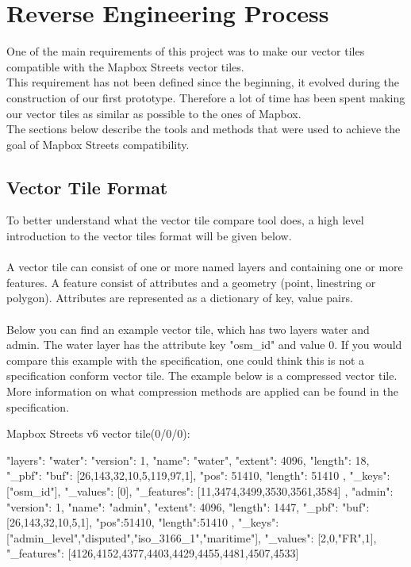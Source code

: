 \section{Reverse Engineering Process}\label{reverse_engineering_process}
One of the main requirements of this project was to make our vector tiles compatible with the Mapbox Streets vector tiles\cite{22_mapbox.com_2015}.
\\
This requirement has not been defined since the beginning, it evolved during the construction of our first prototype.
Therefore a lot of time has been spent making our vector tiles as similar as possible to the ones of Mapbox.
\\
The sections below describe the tools and methods that were used to achieve the goal of Mapbox Streets compatibility.

\subsection{Vector Tile Format}\label{vector_tile_format}
To better understand what the vector tile compare tool does, a high level introduction to the vector tiles format will be given below.
\\\\
A vector tile can consist of one or more named layers and containing one or more features. A feature consist of attributes and a geometry (point, linestring or polygon). Attributes are represented as a dictionary of key, value pairs. 
\\\\
Below you can find an example vector tile, which has two layers water and admin. The water layer has the attribute key "osm\_id" and value 0. If you would compare this example with the specification\cite{4_github_2015}, one could think this is not a specification conform vector tile. The example below is a compressed vector tile. More information on what compression methods are applied can be found in the specification.

Mapbox Streets v6 vector tile(0/0/0):
\begin{jsoncode}
{ 
  "layers": {
    "water": {
      "version": 1,
      "name": "water",
      "extent": 4096,
      "length": 18,
      "_pbf": {
        "buf": [26,143,32,10,5,119,97,1],
        "pos": 51410,
        "length": 51410
      },
      "_keys": ["osm_id"],
      "_values": [0],
      "_features": [11,3474,3499,3530,3561,3584] 
    },
    "admin": {
      "version": 1,
      "name": "admin",
      "extent": 4096,
      "length": 1447,
      "_pbf": {
        "buf": [26,143,32,10,5,1],
        "pos":51410,
        "length":51410
       },
      "_keys": ["admin_level","disputed","iso_3166_1","maritime"],
      "_values": [2,0,"FR",1],
      "_features": [4126,4152,4377,4403,4429,4455,4481,4507,4533]
    }
  } 
}
\end{jsoncode}

